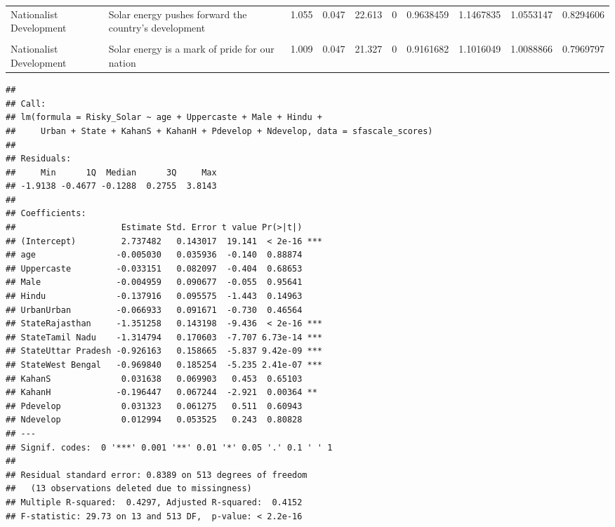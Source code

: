 \documentclass[
]{article}
\begin{document}
\begin{landscape}
\begin{table}[!h]
{\begin{tabular}[t]{l>{\raggedright\arraybackslash}p{4cm}rrrrrrrr}
Nationalist Development & Solar energy pushes forward the country's development & 1.055 & 0.047 & 22.613 & 0 & 0.9638459 & 1.1467835 & 1.0553147 & 0.8294606\\
\cellcolor{gray!6}{Nationalist Development} & \cellcolor{gray!6}{I would be proud if my community used Solar energy} & \cellcolor{gray!6}{1.065} & \cellcolor{gray!6}{0.048} & \cellcolor{gray!6}{22.101} & \cellcolor{gray!6}{0} & \cellcolor{gray!6}{0.9708762} & \cellcolor{gray!6}{1.1598306} & \cellcolor{gray!6}{1.0653534} & \cellcolor{gray!6}{0.8166840}\\
Nationalist Development & Solar energy is a mark of pride for our nation & 1.009 & 0.047 & 21.327 & 0 & 0.9161682 & 1.1016049 & 1.0088866 & 0.7969797\\
\bottomrule
\end{tabular}}
\end{table}
\end{landscape}

\begin{verbatim}
## 
## Call:
## lm(formula = Risky_Solar ~ age + Uppercaste + Male + Hindu + 
##     Urban + State + KahanS + KahanH + Pdevelop + Ndevelop, data = sfascale_scores)
## 
## Residuals:
##     Min      1Q  Median      3Q     Max 
## -1.9138 -0.4677 -0.1288  0.2755  3.8143 
## 
## Coefficients:
##                     Estimate Std. Error t value Pr(>|t|)    
## (Intercept)         2.737482   0.143017  19.141  < 2e-16 ***
## age                -0.005030   0.035936  -0.140  0.88874    
## Uppercaste         -0.033151   0.082097  -0.404  0.68653    
## Male               -0.004959   0.090677  -0.055  0.95641    
## Hindu              -0.137916   0.095575  -1.443  0.14963    
## UrbanUrban         -0.066933   0.091671  -0.730  0.46564    
## StateRajasthan     -1.351258   0.143198  -9.436  < 2e-16 ***
## StateTamil Nadu    -1.314794   0.170603  -7.707 6.73e-14 ***
## StateUttar Pradesh -0.926163   0.158665  -5.837 9.42e-09 ***
## StateWest Bengal   -0.969840   0.185254  -5.235 2.41e-07 ***
## KahanS              0.031638   0.069903   0.453  0.65103    
## KahanH             -0.196447   0.067244  -2.921  0.00364 ** 
## Pdevelop            0.031323   0.061275   0.511  0.60943    
## Ndevelop            0.012994   0.053525   0.243  0.80828    
## ---
## Signif. codes:  0 '***' 0.001 '**' 0.01 '*' 0.05 '.' 0.1 ' ' 1
## 
## Residual standard error: 0.8389 on 513 degrees of freedom
##   (13 observations deleted due to missingness)
## Multiple R-squared:  0.4297, Adjusted R-squared:  0.4152 
## F-statistic: 29.73 on 13 and 513 DF,  p-value: < 2.2e-16
\end{verbatim}
\end{document}
